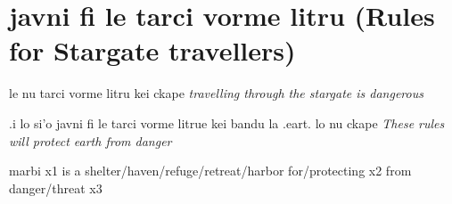 \documentclass{article}
\newcommand{\para}[2]{#1 \emph{#2}}
\newcommand{\usefulWord}[2]{#1 #2}
\begin{document}
\section{javni fi le tarci vorme litru (Rules for Stargate travellers)}

\para{le nu tarci vorme litru kei ckape}{travelling through the stargate is dangerous}

\para{.i lo si'o javni fi le tarci vorme litrue kei bandu la .eart. lo nu ckape}{These rules will protect earth from danger}


\usefulWord{marbi}{x1 is a shelter/haven/refuge/retreat/harbor for/protecting x2 from danger/threat x3}
\end{document}
